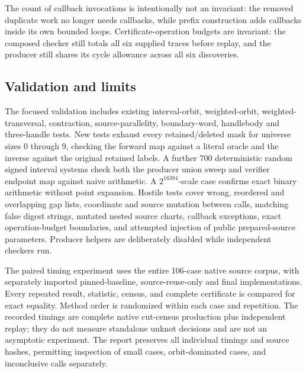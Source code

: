 The count of callback invocations is intentionally not an invariant: the
removed duplicate work no longer needs callbacks, while prefix construction
adds callbacks inside its own bounded loops.  Certificate-operation budgets
are invariant: the composed checker still totals all six supplied traces
before replay, and the producer still shares its cycle allowance across
all six discoveries.

\subsection{Validation and limits}

The focused validation includes existing interval-orbit, weighted-orbit,
weighted-transversal, contraction, source-parallelity, boundary-word,
handlebody and three-handle tests.  New tests exhaust every retained/deleted
mask for universe sizes $0$ through $9$, checking the forward map against a
literal oracle and the inverse against the original retained labels.  A
further 700 deterministic random signed interval systems check both the
producer union sweep and verifier endpoint map against naive arithmetic.
A $2^{16384}$-scale case confirms exact binary arithmetic without point
expansion.  Hostile tests cover wrong, reordered and overlapping gap lists,
coordinate and source mutation between calls, matching false digest strings,
mutated nested source charts, callback exceptions, exact operation-budget
boundaries, and attempted injection of public prepared-source parameters.
Producer helpers are deliberately disabled while independent checkers run.

The paired timing experiment uses the entire 106-case native source corpus,
with separately imported pinned-baseline, source-reuse-only and final
implementations.  Every repeated result, statistic, census, and complete
certificate is compared for exact equality.  Method order is randomized
within each case and repetition.  The recorded timings are complete native
cut-census production plus independent replay; they do not measure standalone
unknot decisions and are not an asymptotic experiment.  The report preserves
all individual timings and source hashes, permitting inspection of small
cases, orbit-dominated cases, and inconclusive calls separately.
